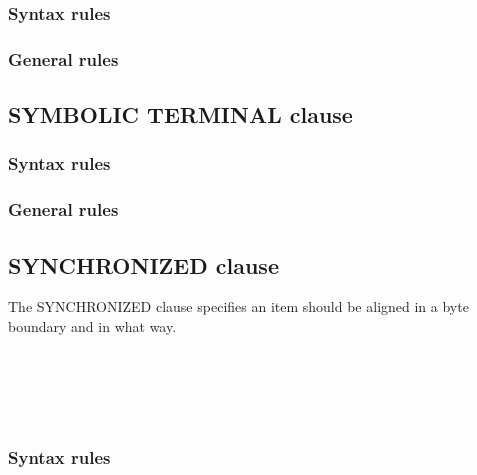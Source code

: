 \subsubsection{Syntax rules}

\subsubsection{General rules}

\subsection{SYMBOLIC TERMINAL clause}

\begin{syntax}[\deletedcolour]
\end{syntax}

\subsubsection{Syntax rules}

\subsubsection{General rules}

\subsection{SYNCHRONIZED clause}

The SYNCHRONIZED clause specifies an item should be aligned in a byte boundary and in what way.

\begin{syntax}
  \begin{1=}
     \\
     \\
  \end{1=}
  \begin{0-1}
     \\
  \end{0-1}
\end{syntax}

\subsubsection{Syntax rules}

